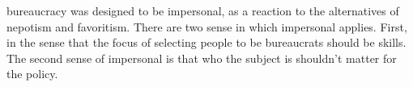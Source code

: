 bureaucracy was designed to be impersonal, as a reaction to the alternatives of nepotism and favoritism. There are two sense in which impersonal applies. First, in the sense that the focus of selecting people to be bureaucrats should be skills. The second sense of impersonal is that who the subject is shouldn't matter for the policy.  